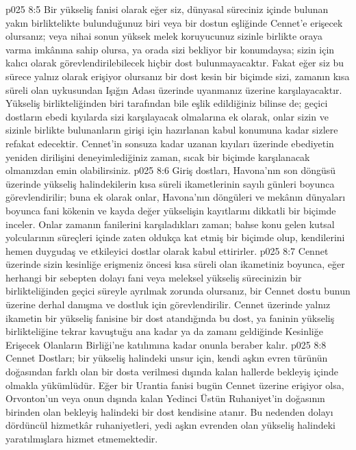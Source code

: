 \vs p025 8:5 Bir yükseliş fanisi olarak eğer siz, dünyasal süreciniz içinde bulunan yakın birliktelikte bulunduğunuz biri veya bir dostun eşliğinde Cennet’e erişecek olursanız; veya nihai sonun yüksek melek koruyucunuz sizinle birlikte oraya varma imkânına sahip olursa, ya orada sizi bekliyor bir konumdaysa; sizin için kalıcı olarak görevlendirilebilecek hiçbir dost bulunmayacaktır. Fakat eğer siz bu sürece yalnız olarak erişiyor olursanız bir dost kesin bir biçimde sizi, zamanın kısa süreli olan uykusundan Işığın Adası üzerinde uyanmanız üzerine karşılayacaktır. Yükseliş birlikteliğinden biri tarafından bile eşlik edildiğiniz bilinse de; geçici dostların ebedi kıyılarda sizi karşılayacak olmalarına ek olarak, onlar sizin ve sizinle birlikte bulunanların girişi için hazırlanan kabul konumuna kadar sizlere refakat edecektir. Cennet’in sonsuza kadar uzanan kıyıları üzerinde ebediyetin yeniden dirilişini deneyimlediğiniz zaman, sıcak bir biçimde karşılanacak olmanızdan emin olabilirsiniz.
\vs p025 8:6 Giriş dostları, Havona’nın son döngüsü üzerinde yükseliş halindekilerin kısa süreli ikametlerinin sayılı günleri boyunca görevlendirilir; buna ek olarak onlar, Havona’nın döngüleri ve mekânın dünyaları boyunca fani kökenin ve kayda değer yükselişin kayıtlarını dikkatli bir biçimde inceler. Onlar zamanın fanilerini karşıladıkları zaman; bahse konu gelen kutsal yolcularının süreçleri içinde zaten oldukça kat etmiş bir biçimde olup, kendilerini hemen duygudaş ve etkileyici dostlar olarak kabul ettirirler.
\vs p025 8:7 Cennet üzerinde sizin kesinliğe erişmeniz öncesi kısa süreli olan ikametiniz boyunca, eğer herhangi bir sebepten dolayı fani veya meleksel yükseliş sürecinizin bir birlikteliğinden geçici süreyle ayrılmak zorunda olursanız, bir Cennet dostu bunun üzerine derhal danışma ve dostluk için görevlendirilir. Cennet üzerinde yalnız ikametin bir yükseliş fanisine bir dost atandığında bu dost, ya faninin yükseliş birlikteliğine tekrar kavuştuğu ana kadar ya da zamanı geldiğinde Kesinliğe Erişecek Olanların Birliği’ne katılımına kadar onunla beraber kalır.
\vs p025 8:8 Cennet Dostları; bir yükseliş halindeki unsur için, kendi aşkın evren türünün doğasından farklı olan bir dosta verilmesi dışında kalan hallerde bekleyiş içinde olmakla yükümlüdür. Eğer bir Urantia fanisi bugün Cennet üzerine erişiyor olsa, Orvonton’un veya onun dışında kalan Yedinci Üstün Ruhaniyet’in doğasının birinden olan bekleyiş halindeki bir dost kendisine atanır. Bu nedenden dolayı dördüncül hizmetkâr ruhaniyetleri, yedi aşkın evrenden olan yükseliş halindeki yaratılmışlara hizmet etmemektedir.
